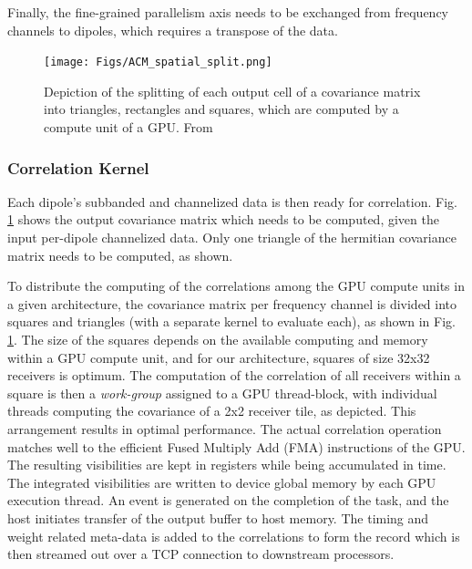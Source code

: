 \documentclass{ws-jai}
\begin{document}
Finally, the  fine-grained parallelism axis  needs to be exchanged  from frequency
channels to dipoles, which requires a transpose of the data.

\begin{figure}[htbp]
\centering
\texttt{[image: Figs/ACM\_spatial\_split.png]}
\caption {Depiction of the splitting of  each output cell of a covariance matrix
  into triangles, rectangles  and squares, which are computed by  a compute unit
  of a GPU. From \cite{romein2016comparison}}
\label{fig:acm_spatial_split}
\end{figure}

\subsubsection {Correlation Kernel}
  Each dipole's subbanded and channelized
data is then ready for  correlation.  Fig. \ref{fig:acm_spatial_split} shows the
output covariance matrix which needs to  be computed, given the input per-dipole
channelized data. Only  one triangle of the hermitian  covariance matrix needs
to be computed, as shown.

To distribute the computing of the correlations among the GPU compute units in a
given architecture, the covariance matrix  per frequency channel is divided into
squares and  triangles (with a  separate kernel to  evaluate each), as  shown in
Fig.   \ref{fig:acm_spatial_split}.  The size  of  the  squares depends  on  the
available  computing  and  memory  within  a  GPU  compute  unit,  and  for  our
architecture, squares of size 32x32 receivers is optimum. The computation of the
correlation of  all receivers  within a  square is  then a  \textit {work-group}
assigned to a GPU thread-block, with individual threads computing the covariance
of  a 2x2  receiver  tile,  as depicted.  This  arrangement  results in  optimal
performance.  The  actual correlation  operation matches  well to  the efficient
Fused Multiply  Add (FMA) instructions  of the GPU.  The  resulting visibilities
are  kept  in  registers  while   being  accumulated  in  time.  The  integrated
visibilities are written  to device global memory by each  GPU execution thread.
An event  is generated  on the completion  of the task,  and the  host initiates
transfer of  the output buffer  to host memory.   The timing and  weight related
meta-data is added to the correlations to form the record which is then streamed
out over a TCP connection to downstream processors.\\
\end{document}
